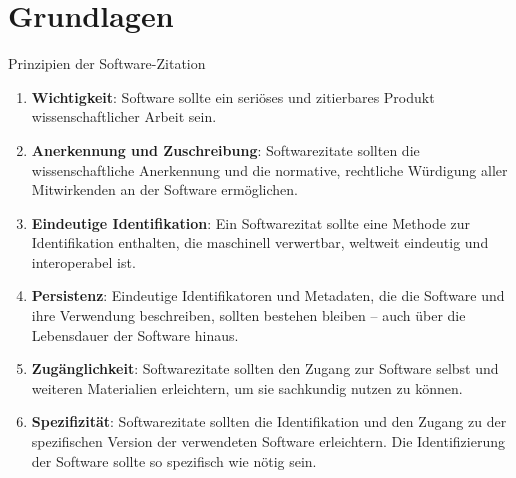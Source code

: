 \documentclass[%
    handout,
    aspectratio=1610,
    10pt,
    onlytextwidth, %
]{beamer}
\begin{document}
\section{Grundlagen}

\begin{frame}{Prinzipien der Software-Zitation \autocite{smith_software_2016}}
    \begin{enumerate}
        \item \textcolor{links}{\textbf{Wichtigkeit}}: Software sollte ein seriöses und zitierbares Produkt wissenschaftlicher Arbeit sein.
        \item \textcolor{links}{\textbf{Anerkennung und Zuschreibung}}: Softwarezitate sollten die wissenschaftliche Anerkennung und die normative, rechtliche Würdigung aller Mitwirkenden an der Software ermöglichen.
        \item \textcolor{links}{\textbf{Eindeutige Identifikation}}: Ein Softwarezitat sollte eine Methode zur Identifikation enthalten, die maschinell verwertbar, weltweit eindeutig und interoperabel ist.
        \item \textcolor{links}{\textbf{Persistenz}}: Eindeutige Identifikatoren und Metadaten, die die Software und ihre Verwendung beschreiben, sollten bestehen bleiben – auch über die Lebensdauer der Software hinaus.
        \item \textcolor{links}{\textbf{Zugänglichkeit}}: Softwarezitate sollten den Zugang zur Software selbst und weiteren Materialien erleichtern, um sie sachkundig nutzen zu können.
        \item \textcolor{links}{\textbf{Spezifizität}}: Softwarezitate sollten die Identifikation und den Zugang zu der spezifischen Version der verwendeten Software erleichtern. Die Identifizierung der Software sollte so spezifisch wie nötig sein.
    \end{enumerate}
\end{frame}
\end{document}

